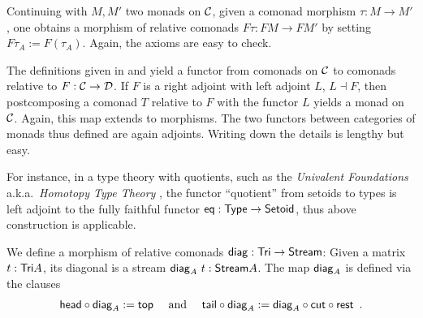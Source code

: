 \documentclass[envcountsame]{llncs}
\begin{document}
\begin{Long}

\begin{example}\label{ex_relcom_from_com_morphism}
 Continuing  with $M, M'$ two monads on ${\mathcal{C}}$, given a comonad morphism $\tau : M \to M'$, one obtains a morphism of 
 relative comonads $F\tau : FM\to FM'$ by setting $F\tau_A := F(\tau_A)$.
 Again, the axioms are easy to check.
\end{example}


\begin{remark}
 The definitions given in  and  yield a functor from 
 comonads on ${\mathcal{C}}$ to comonads relative to $F:{\mathcal{C}}\to\mathcal{D}$. 
 If $F$ is a right adjoint with left adjoint $L$, $L\dashv F$, then postcomposing a comonad $T$ relative to $F$ with the functor $L$
 yields a monad on ${\mathcal{C}}$. Again, this map extends to morphisms.
 The two functors between categories of monads thus defined are again adjoints.
 Writing down the details is lengthy but easy.
 
 For instance, in a type theory with quotients, such as the \emph{Univalent Foundations} a.k.a.\ \emph{Homotopy Type Theory}
 \parencite{hottbook}, the functor \enquote{quotient} from setoids to types is left adjoint to the fully faithful 
 functor $\mathsf{eq}: \mathsf{Type}\to\mathsf{Setoid}$, thus above construction is applicable.
\end{remark}

\end{Long}


\begin{example}\label{ex_diag}
We define a morphism of relative comonads $\mathsf{diag} : \mathsf{Tri} \to \mathsf{Stream}$:
Given a matrix $t : \mathsf{Tri} A$, its diagonal is a stream $\mathsf{diag}_A~t : \mathsf{Stream} A$.
The map $\mathsf{diag}_A$ is defined via the clauses
\begin{align*} \comp{\diagonal_A}{\shead} := \head \quad\text{ and } \quad %
                  \comp{\diagonal_A}{\stail} := \comp{\comp{\tail}{\cut}}{\diagonal_A} \enspace . %
    \end{align*}
\end{example}
\end{document}
